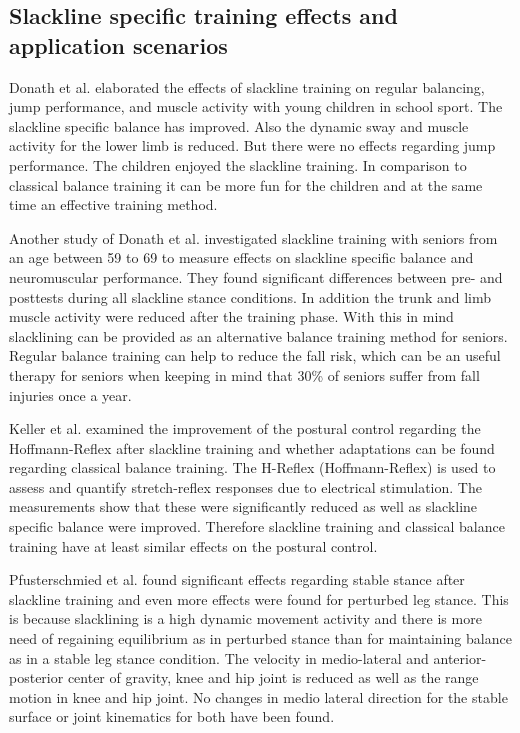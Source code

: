 \subsection{Slackline specific training effects and application scenarios}

Donath et al. \cite{Donath2013-kk} elaborated the effects of slackline training on regular balancing, jump performance, and muscle activity with young children in school sport. The slackline specific balance has improved. Also the dynamic sway and muscle activity for the lower limb is reduced. But there were no effects regarding jump performance. The children enjoyed the slackline training. In comparison to classical balance training it can be more fun for the children and at the same time an effective training method.

Another study of Donath et al. \cite{Donath2016-gm} investigated slackline training with seniors from an age between 59 to 69 to measure effects on slackline specific balance and neuromuscular performance. They found significant differences between pre- and posttests during all slackline stance conditions. In addition the trunk and limb muscle activity were reduced after the training phase. With this in mind slacklining can be provided as an alternative balance training method for seniors. Regular balance training can help to reduce the fall risk, which can be an useful therapy for seniors when keeping in mind that 30\% of seniors suffer from fall injuries once a year.

Keller et al. \cite{Keller2012-xh} examined the improvement of the postural control regarding the Hoffmann-Reflex after slackline training and whether adaptations can be found regarding classical balance training. The H-Reflex (Hoffmann-Reflex) is used to assess and quantify stretch-reflex responses due to electrical stimulation. The measurements show that these were significantly reduced as well as slackline specific balance were improved. Therefore slackline training and classical balance training have at least similar effects on the postural control.

Pfusterschmied et al. \cite{Pfusterschmied2013-yy} found significant effects regarding stable stance after slackline training and even more effects were found for perturbed leg stance. This is because slacklining is a high dynamic movement activity and there is more need of regaining equilibrium as in perturbed stance than for maintaining balance as in a stable leg stance condition. The velocity in medio-lateral and anterior-posterior center of gravity, knee and hip joint is reduced as well as the range motion in knee and hip joint. No changes in medio lateral direction for the stable surface or joint kinematics for both have been found.

